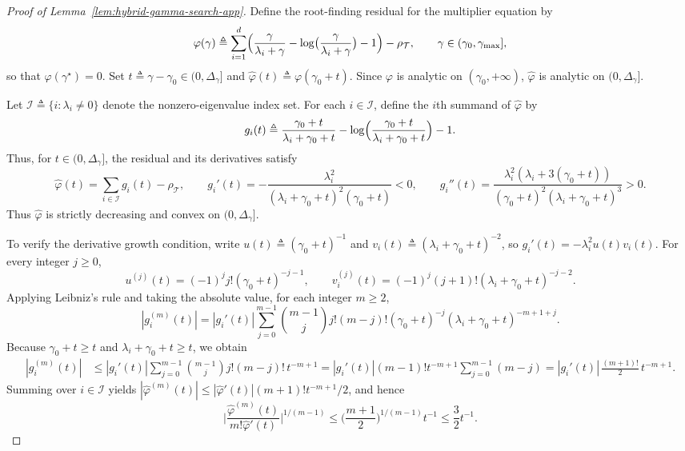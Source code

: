 \documentclass[11pt, letterpaper, oneside, reqno]{amsart}
\newcommand{\opt}{^\star}
\newcommand{\Let}{\triangleq}
\begin{document}
\begin{proof}[Proof of Lemma~\ref{lem:hybrid-gamma-search-app}]
Define the root-finding residual for the multiplier equation by
\[
\varphi(\gamma) \Let \sum_{i=1}^d \Bigl( \frac{\gamma}{\lambda_i+\gamma} -\log\bigl(\frac{\gamma}{\lambda_i+\gamma}\bigr) -1 \Bigr) -\rho_{\mathcal T},
\qquad \gamma\in(\gamma_0,\gamma_{\max}],
\]
so that $\varphi(\gamma\opt)=0$. 
Set
$t\Let\gamma-\gamma_0\in(0,\Delta_\gamma]$ and
$\widehat\varphi(t)\Let\varphi(\gamma_0+t)$. Since $\varphi$ is analytic on
$(\gamma_0,+\infty)$, $\widehat\varphi$ is analytic on $(0,\Delta_\gamma]$.

Let $\mathcal I \Let \{i:\lambda_i\neq 0\}$ denote the nonzero-eigenvalue index set. For each $i\in\mathcal I$, define the $i$th summand of $\widehat\varphi$ by
\[
g_i(t) \Let \frac{\gamma_0+t}{\lambda_i+\gamma_0+t} -\log\Bigl(\frac{\gamma_0+t}{\lambda_i+\gamma_0+t}\Bigr) -1.
\]
Thus, for $t\in(0,\Delta_\gamma]$, the residual and its derivatives satisfy
\[
\widehat\varphi(t)=\sum_{i\in\mathcal I} g_i(t)-\rho_{\mathcal T},
\qquad
g_i'(t) = -\frac{\lambda_i^2}{(\lambda_i+\gamma_0+t)^2(\gamma_0+t)} <0,
\qquad
g_i''(t) = \frac{\lambda_i^2(\lambda_i+3(\gamma_0+t))} {(\gamma_0+t)^2(\lambda_i+\gamma_0+t)^3}>0.
\]
Thus $\widehat\varphi$ is strictly decreasing and convex on $(0,\Delta_\gamma]$.

To verify the derivative growth condition, write
$u(t)\Let(\gamma_0+t)^{-1}$ and $v_i(t)\Let(\lambda_i+\gamma_0+t)^{-2}$,
so $g_i'(t)=-\lambda_i^2 u(t)v_i(t)$. For every integer $j\ge 0$,
\[
u^{(j)}(t)=(-1)^j j!(\gamma_0+t)^{-j-1},
\qquad
v_i^{(j)}(t)=(-1)^j (j+1)!(\lambda_i+\gamma_0+t)^{-j-2}.
\]
Applying Leibniz's rule and taking the absolute value, for each integer $m\ge 2$,
\[
|g_i^{(m)}(t)|
=
|g_i'(t)|
\sum_{j=0}^{m-1}
\binom{m-1}{j}
j!(m-j)!
(\gamma_0+t)^{-j}
(\lambda_i+\gamma_0+t)^{-m+1+j}.
\]
Because $\gamma_0+t\ge t$ and $\lambda_i+\gamma_0+t\ge t$, we obtain
\begin{align*}
|g_i^{(m)}(t)|
&\le
|g_i'(t)|
\sum_{j=0}^{m-1}
\binom{m-1}{j}j!(m-j)! \, t^{-m+1}
= |g_i'(t)|(m-1)!t^{-m+1}\sum_{j=0}^{m-1}(m-j)
= |g_i'(t)|\,\frac{(m+1)!}{2}\,t^{-m+1}.
\end{align*}
Summing over $i\in\mathcal I$ yields
$|\widehat\varphi^{(m)}(t)|
\le |\widehat\varphi'(t)|(m+1)!t^{-m+1}/2$,
and hence
\[
\bigl| \frac{\widehat\varphi^{(m)}(t)}{m!\widehat\varphi'(t)} \bigr|^{1/(m-1)}
\le \bigl(\frac{m+1}{2}\bigr)^{1/(m-1)} t^{-1}
\le \frac{3}{2}t^{-1}.
\]


\end{proof}
\end{document}
